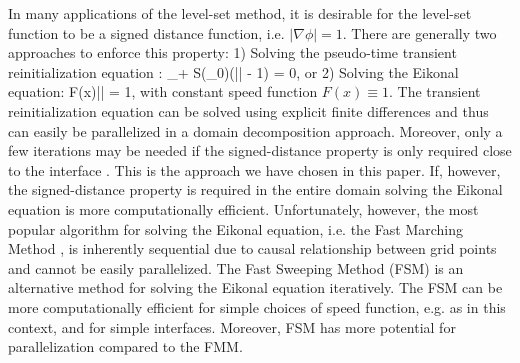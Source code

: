 In many applications of the level-set method, it is desirable for the level-set function to be a signed distance function, i.e. $|\nabla \phi| = 1$. There are generally two approaches to enforce this property: 1) Solving the pseudo-time transient reinitialization equation \cite{Sussman;Smereka;Osher:94:A-Level-Set-Approach, Osher;Fedkiw:01:Level-Set-Methods:-A}:
\ben
\phi_\tau + S(\phi_0)\left(|\nabla \phi| - 1\right) = 0,
\een
or 2) Solving the Eikonal equation:
\ben
F(x)|\nabla\phi| = 1,
\een 
with constant speed function $F(x) \equiv 1$. The transient reinitialization equation can be solved using explicit finite differences and thus can easily be parallelized in a domain decomposition approach. Moreover, only a few iterations may be needed if the signed-distance property is only required close to the interface \cite{Min;Gibou:07:A-second-order-accur}. This is the approach we have chosen in this paper. If, however, the signed-distance property is required in the entire domain solving the Eikonal equation is more computationally efficient. Unfortunately, however, the most popular algorithm for solving the Eikonal equation, i.e. the Fast Marching Method \cite{Sethian:96:A-Fast-Marching-Leve,Sethian:99:Level-set-methods-an}, is inherently sequential due to causal relationship between grid points and cannot be easily parallelized. The Fast Sweeping Method (FSM) \cite{Zhao:05:A-fast-sweeping-meth} is an alternative method for solving the Eikonal equation iteratively. The FSM can be more computationally efficient for simple choices of speed function, e.g. as in this context, and for simple interfaces. Moreover, FSM has more potential for parallelization compared to the FMM.

